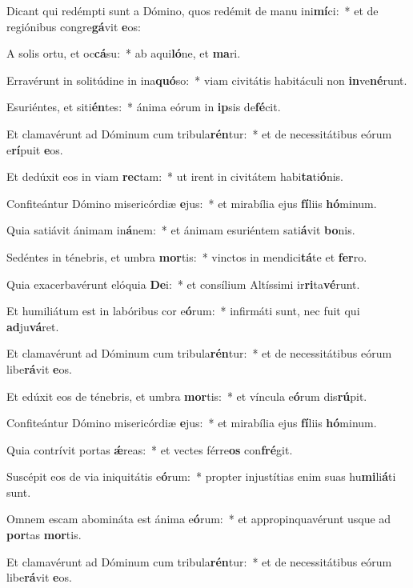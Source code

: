 \item Dicant qui redémpti sunt a Dómino, quos redémit de manu ini\textbf{mí}ci:~* et de regiónibus congre\textbf{gá}vit \textbf{e}os:
\item A solis ortu, et oc\textbf{cá}su:~* ab aqui\textbf{ló}ne, et \textbf{ma}ri.
\item Erravérunt in solitúdine in ina\textbf{quó}so:~* viam civitátis habitáculi non \textbf{in}ve\textbf{né}runt.
\item Esuriéntes, et siti\textbf{én}tes:~* ánima eórum in \textbf{ip}sis de\textbf{fé}cit.
\item Et clamavérunt ad Dóminum cum tribula\textbf{rén}tur:~* et de necessitátibus eórum e\textbf{rí}puit \textbf{e}os.
\item Et dedúxit eos in viam \textbf{rec}tam:~* ut irent in civitátem habi\textbf{ta}ti\textbf{ó}nis.
\item Confiteántur Dómino misericórdiæ \textbf{e}jus:~* et mirabília ejus \textbf{fí}liis \textbf{hó}minum.
\item Quia satiávit ánimam in\textbf{á}nem:~* et ánimam esuriéntem sati\textbf{á}vit \textbf{bo}nis.
\item Sedéntes in ténebris, et umbra \textbf{mor}tis:~* vinctos in mendici\textbf{tá}te et \textbf{fer}ro.
\item Quia exacerbavérunt elóquia \textbf{De}i:~* et consílium Altíssimi ir\textbf{ri}ta\textbf{vé}runt.
\item Et humiliátum est in labóribus cor e\textbf{ó}rum:~* infirmáti sunt, nec fuit qui \textbf{ad}ju\textbf{vá}ret.
\item Et clamavérunt ad Dóminum cum tribula\textbf{rén}tur:~* et de necessitátibus eórum libe\textbf{rá}vit \textbf{e}os.
\item Et edúxit eos de ténebris, et umbra \textbf{mor}tis:~* et víncula e\textbf{ó}rum dis\textbf{rú}pit.
\item Confiteántur Dómino misericórdiæ \textbf{e}jus:~* et mirabília ejus \textbf{fí}liis \textbf{hó}minum.
\item Quia contrívit portas \textbf{ǽ}reas:~* et vectes férre\textbf{os} con\textbf{fré}git.
\item Suscépit eos de via iniquitátis e\textbf{ó}rum:~* propter injustítias enim suas hu\textbf{mi}li\textbf{á}ti sunt.
\item Omnem escam abomináta est ánima e\textbf{ó}rum:~* et appropinquavérunt usque ad \textbf{por}tas \textbf{mor}tis.
\item Et clamavérunt ad Dóminum cum tribula\textbf{rén}tur:~* et de necessitátibus eórum libe\textbf{rá}vit \textbf{e}os.
